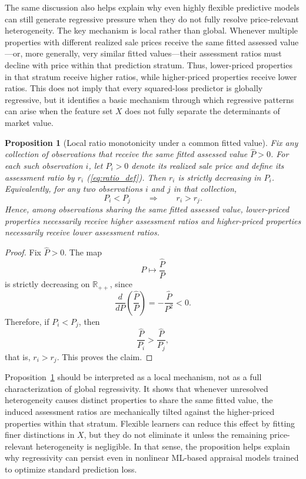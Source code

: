 \documentclass[12pt]{article}
\theoremstyle{plain}
\newtheorem{proposition}{Proposition}
\theoremstyle{definition}
\begin{document}
The same discussion also helps explain why even highly flexible predictive models can still generate regressive pressure when they do not fully resolve price-relevant heterogeneity. The key mechanism is local rather than global. Whenever multiple properties with different realized sale prices receive the same fitted assessed value---or, more generally, very similar fitted values---their assessment ratios must decline with price within that prediction stratum. Thus, lower-priced properties in that stratum receive higher ratios, while higher-priced properties receive lower ratios. This does not imply that every squared-loss predictor is globally regressive, but it identifies a basic mechanism through which regressive patterns can arise when the feature set \(X\) does not fully separate the determinants of market value.

\begin{proposition}[Local ratio monotonicity under a common fitted value]
\label{prop:local_ratio_monotonicity}
Fix any collection of observations that receive the same fitted assessed value \(\hat P>0\). For each such observation \(i\), let \(P_i>0\) denote its realized sale price and define its assessment ratio by $r_i$ (\ref{eq:ratio_def}).
Then \(r_i\) is strictly decreasing in \(P_i\). Equivalently, for any two observations \(i\) and \(j\) in that collection,
\[
P_i<P_j
\qquad\Longrightarrow\qquad
r_i>r_j.
\]
Hence, among observations sharing the same fitted assessed value, lower-priced properties necessarily receive higher assessment ratios and higher-priced properties necessarily receive lower assessment ratios.
\end{proposition}

\begin{proof}
Fix \(\hat P>0\). The map
\[
P \mapsto \frac{\hat P}{P}
\]
is strictly decreasing on \(\mathbb{R}_{++}\), since
\[
\frac{d}{dP}\left(\frac{\hat P}{P}\right)=-\frac{\hat P}{P^2}<0.
\]
Therefore, if \(P_i<P_j\), then
\[
\frac{\hat P}{P_i}>\frac{\hat P}{P_j},
\]
that is, \(r_i>r_j\). This proves the claim.
\end{proof}

Proposition~\ref{prop:local_ratio_monotonicity} should be interpreted as a local mechanism, not as a full characterization of global regressivity. It shows that whenever unresolved heterogeneity causes distinct properties to share the same fitted value, the induced assessment ratios are mechanically tilted against the higher-priced properties within that stratum. Flexible learners can reduce this effect by fitting finer distinctions in \(X\), but they do not eliminate it unless the remaining price-relevant heterogeneity is negligible. In that sense, the proposition helps explain why regressivity can persist even in nonlinear ML-based appraisal models trained to optimize standard prediction loss.
\end{document}
